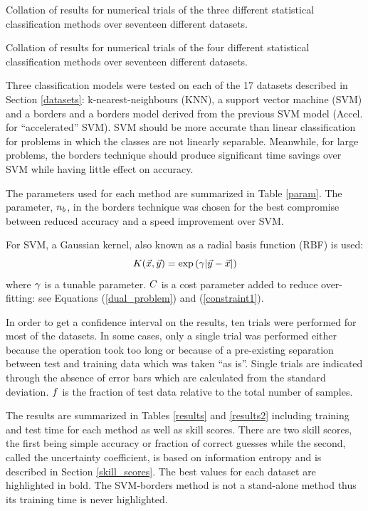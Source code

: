 \begin{table}
	\caption{Collation of results for numerical trials of the three different statistical classification methods over seventeen different datasets.}
	\label{results}
	{\small
		
	}
\end{table}

\begin{table}
	\caption{Collation of results for numerical trials of the four different statistical classification methods over seventeen different datasets.}
	\label{results2}
	{\small
		
	}
\end{table}

Three classification models were tested on each of the 17 datasets described in
Section \ref{datasets}: k-nearest-neighbours (KNN), 
a support vector machine (SVM) and a borders and a borders
model derived from the previous SVM model (Accel. for ``accelerated'' SVM).
SVM should be more accurate than linear classification for problems in which
the classes are not linearly separable.
Meanwhile, for large problems, the borders technique should produce significant time savings over SVM while having little effect on accuracy.

The parameters used for each method are summarized in Table \ref{param}.
The parameter, $n_b$, in the borders technique
was chosen for the best compromise between reduced accuracy and a speed
improvement over SVM. 

For SVM, a Gaussian kernel, also known as a radial basis function (RBF) is used:
\begin{equation}
	K(\vec x, \vec y) = \exp \left ( \gamma | \vec y - \vec x | \right )
\end{equation}
where $\gamma$ is a tunable parameter. 
$C$ is a cost parameter added to reduce over-fitting: see
Equations (\ref{dual_problem}) and (\ref{constraint1}).

In order to get a confidence interval on the results,
ten trials were performed for most of the datasets.
In some cases, only a single trial was performed either because the operation
took too long or because of a pre-existing separation between test and training
data which was taken ``as is''. Single trials are indicated through the absence of
error bars which are calculated from the standard deviation.
$f$ is the fraction of test data relative to the total number
of samples.

The results are summarized in Tables \ref{results} and \ref{results2} including training
and test time for each method as well as skill scores. There are two skill scores,
the first being simple accuracy or fraction of correct guesses while the second,
called the uncertainty coefficient, is based on information entropy and is described in Section \ref{skill_scores}.
The best values for each dataset are highlighted in bold.
The SVM-borders method is not a stand-alone method thus its training time is never
highlighted.

